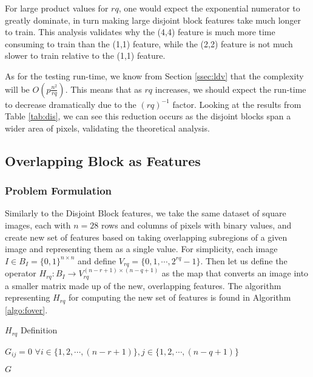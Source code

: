 \documentclass{article}[12pt]
\begin{document}
  For large product values for $rq$, one would expect the exponential numerator to greatly dominate, in turn making large disjoint block features take much longer to train. This analysis validates why the (4,4) feature is much more time consuming to train than the (1,1) feature, while the (2,2) feature is not much slower to train relative to the (1,1) feature.
  
  As for the testing run-time, we know from Section \ref{ssec:ldv} that the complexity will be $O\left(p\frac{n^2}{rq}\right)$. This means that as $rq$ increases, we should expect the run-time to decrease dramatically due to the $(rq)^{-1}$ factor. Looking at the results from Table \ref{tab:dis}, we can see this reduction occurs as the disjoint blocks span a wider area of pixels, validating the theoretical analysis.
  
   \subsection{Overlapping Block as Features}
   \subsubsection{Problem Formulation}
   Similarly to the Disjoint Block features, we take the same dataset of square images, each with $n = 28$ rows and columns of pixels with binary values, and create new set of features based on taking overlapping subregions of a given image and representing them as a single value. For simplicity, each image $I \in B_I = \lbrace 0,1 \rbrace^{n \times n}$ and define $V_{rq} = \lbrace 0, 1, \cdots, 2^{rq}-1 \rbrace$. Then let us define the operator $H_{rq}: B_I \rightarrow V_{rq}^{(n-r+1) \times (n-q+1)}$ as the map that converts an image into a smaller matrix made up of the new, overlapping features. The algorithm representing $H_{rq}$ for computing the new set of features is found in Algorithm \ref{algo:fover}.
   
   \begin{algorithm}[H]
   	\caption{$H_{rq}$ Definition }
   	\;
   	
   	$G_{ij} = 0$  $\forall i \in \lbrace 1, 2, \cdots, (n-r+1)\rbrace, j \in \lbrace 1, 2, \cdots, (n-q+1) \rbrace $
   	\;
   	\;
   	
   	\;
   	
   	\Return $G$
   	\label{algo:fover}
   \end{algorithm}
   
\end{document}

